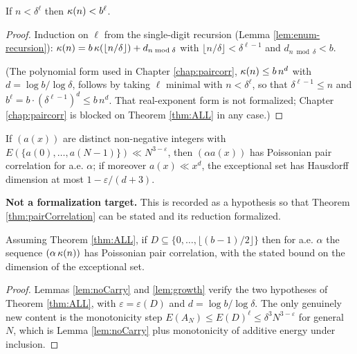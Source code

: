 \begin{lemma}
  \label{lem:growth}
  \leanok
  If $n < \delta^\ell$ then $\kappa(n) < b^\ell$.
\end{lemma}
\begin{proof}
  \leanok
  Induction on $\ell$ from the single-digit recursion
  (Lemma \ref{lem:enum-recursion}): $\kappa(n) = b\,
  \kappa(\lfloor n/\delta \rfloor) + d_{n \bmod \delta}$ with
  $\lfloor n/\delta \rfloor < \delta^{\ell-1}$ and
  $d_{n \bmod \delta} < b$.

  (The polynomial form used in Chapter \ref{chap:paircorr},
  $\kappa(n) \leq b\,n^{d}$ with $d = \log b / \log \delta$, follows by
  taking $\ell$ minimal with $n < \delta^{\ell}$, so that
  $\delta^{\ell-1} \leq n$ and $b^{\ell} = b \cdot (\delta^{\ell-1})^{d}
  \leq b\,n^{d}$.  That real-exponent form is not formalized; Chapter
  \ref{chap:paircorr} is blocked on Theorem \ref{thm:ALL} in any case.)
\end{proof}

\begin{theorem}
  \label{thm:ALL}
  \notready
  If $(a(x))$ are distinct non-negative integers with
  $E(\{a(0),\ldots,a(N-1)\}) \ll N^{3-\varepsilon}$, then $(\alpha a(x))$ has
  Poissonian pair correlation for a.e. $\alpha$; if moreover
  $a(x) \ll x^d$, the exceptional set has Hausdorff dimension at most
  $1 - \varepsilon/(d+3)$.

  \textbf{Not a formalization target.} This is recorded as a hypothesis so
  that Theorem \ref{thm:pairCorrelation} can be stated and its reduction
  formalized.
\end{theorem}

\begin{theorem}[Proposition 7.3]
  \label{thm:pairCorrelation}
  \notready
  Assuming Theorem \ref{thm:ALL}, if $D \subseteq
  \{0,\ldots,\lfloor (b-1)/2\rfloor\}$ then for a.e. $\alpha$ the sequence
  $(\alpha\,\kappa(n))$ has Poissonian pair correlation, with the stated bound
  on the dimension of the exceptional set.
\end{theorem}
\begin{proof}
  Lemmas \ref{lem:noCarry} and \ref{lem:growth} verify the two hypotheses of
  Theorem \ref{thm:ALL}, with $\varepsilon = \varepsilon(D)$ and
  $d = \log b/\log\delta$. The only genuinely new content is the monotonicity
  step $E(A_N) \leq E(D)^\ell \leq \delta^3 N^{3-\varepsilon}$ for general
  $N$, which is Lemma \ref{lem:noCarry} plus monotonicity of additive energy
  under inclusion.
\end{proof}
